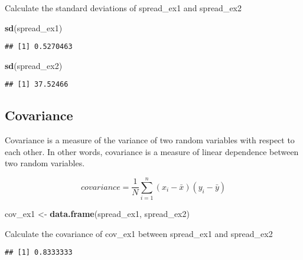 \documentclass[11pt,]{article}
\newenvironment{Shaded}{\begin{snugshade}}{\end{snugshade}}
\newcommand{\KeywordTok}[1]{\textcolor[rgb]{0.13,0.29,0.53}{\textbf{#1}}}
\newcommand{\StringTok}[1]{\textcolor[rgb]{0.31,0.60,0.02}{#1}}
\newcommand{\OperatorTok}[1]{\textcolor[rgb]{0.81,0.36,0.00}{\textbf{#1}}}
\newcommand{\NormalTok}[1]{#1}
\begin{document}
Calculate the standard deviations of spread\_ex1 and spread\_ex2

\begin{Shaded}
\begin{Highlighting}[]
\KeywordTok{sd}\NormalTok{(spread_ex1)}
\end{Highlighting}
\end{Shaded}

\begin{verbatim}
## [1] 0.5270463
\end{verbatim}

\begin{Shaded}
\begin{Highlighting}[]
\KeywordTok{sd}\NormalTok{(spread_ex2)}
\end{Highlighting}
\end{Shaded}

\begin{verbatim}
## [1] 37.52466
\end{verbatim}

\subsection{Covariance}\label{covariance}

Covariance is a measure of the variance of two random variables with
respect to each other. In other words, covariance is a measure of linear
dependence between two random variables.

\[covariance=\frac{1}{N}\sum_{i=1}^{n}(x_i - \bar{x})(y_i - \bar{y})\]

\begin{Shaded}
\begin{Highlighting}[]
\NormalTok{cov_ex1 <-}\StringTok{ }\KeywordTok{data.frame}\NormalTok{(spread_ex1, spread_ex2)}
\end{Highlighting}
\end{Shaded}

Calculate the covariance of cov\_ex1 between spread\_ex1 and spread\_ex2

\begin{Shaded}
\end{Shaded}

\begin{verbatim}
## [1] 0.8333333
\end{verbatim}
\end{document}
